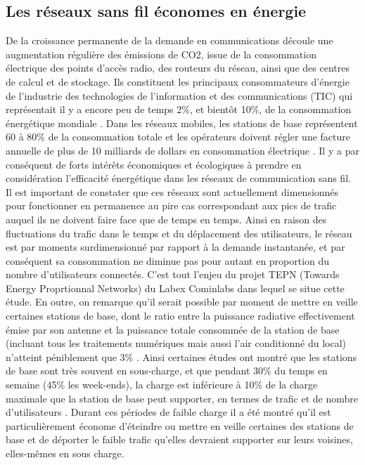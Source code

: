 \subsection*{Les réseaux sans fil économes en énergie}

De la croissance permanente de la demande en communications découle une augmentation régulière des émissions de CO2, issue de la consommation électrique des points d’accès radio, des routeurs du réseau, ainsi que des centres de calcul et de stockage. Ils constituent les principaux consommateurs d’énergie de l’industrie des technologies de l’information et des communications (TIC) qui représentait il y a encore peu de temps 2\%, et bientôt 10\%, de la consommation énergétique mondiale \cite{Ajmone_2009}. Dans les réseaux mobiles, les stations de base représentent 60 à 80\% de la consommation totale \cite{Fettweis_2008} et les opérateurs doivent régler une facture annuelle de plus de 10 milliards de dollars en consommation électrique \cite{Son_2011,Peng_2011}. Il y a par conséquent de forts intérêts économiques et écologiques à prendre en considération l’efficacité énergétique dans les réseaux de communication sans fil. Il est important de constater que ces réseaux sont actuellement dimensionnés pour fonctionner en permanence au pire cas correspondant aux pics de trafic auquel ils ne doivent faire face que de temps en temps. Ainsi en raison des fluctuations du trafic dans le temps et du déplacement des utilisateurs, le réseau est par moments surdimensionné par rapport à la demande instantanée, et par conséquent sa consommation ne diminue pas pour autant en proportion du nombre d’utilisateurs connectés. C’est tout l’enjeu du projet TEPN (Towards Energy Proprtionnal Networks) du Labex Cominlabs dans lequel se situe cette étude. En outre, on remarque qu’il serait possible par moment de mettre en veille certaines stations de base, dont le ratio entre la puissance radiative effectivement émise par son antenne et la puissance totale consommée de la station de base (incluant tous les traitements numériques mais aussi l’air conditionné du local) n’atteint péniblement que 3\% \cite{karl_2003}. 
Ainsi certaines études ont montré que les stations de base sont très souvent en sous-charge, et que pendant 30\% du temps en semaine (45\% les week-ends), la charge est inférieure à 10\% de la charge maximale que la station de base peut supporter, en termes de trafic et de nombre d’utilisateurs \cite{Oh_2011}. Durant ces périodes de faible charge il a été montré \cite{Son_2011} qu’il est particulièrement économe d’éteindre ou mettre en veille certaines des stations de base et de déporter le faible trafic qu’elles devraient supporter sur leurs voisines, elles-mêmes en sous charge.
